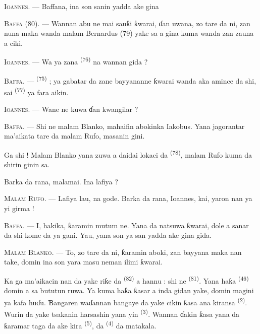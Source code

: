 \VUsaut{3.0mm}

\textsc{Ioannes}. --- Baffana, ina son sanin yadda ake gina

\textsc{Baffa} (80). --- Wannan abu ne mai sauƙi ƙwarai, ɗan uwana, zo
tare da ni, zan nuna maka wanda malam Bernardus (79) yake sa a gina
kuma wanda zan zauna a ciki.

\textsc{Ioannes}. --- Wa ya zana 
\textsuperscript{(76)} na wannan gida ?

\textsc{Baffa}. ---  \textsuperscript{(75)} ; ya
gabatar da zane bayyananne ƙwarai wanda aka amince da shi, sai
 \textsuperscript{(77)} ya fara aikin.

\textsc{Ioannes}. --- Wane ne kuwa ɗan kwangilar ?

\textsc{Baffa}. --- Shi ne malam Blanko, mahaifin abokinka Iakobus.
Yana jagorantar ma’aikata tare da malam Rufo, masanin gini.

Ga shi ! Malam Blanko yana zuwa a daidai lokaci da 
\textsuperscript{(78)}, malam Rufo kuma da shirin ginin sa.

Barka da rana, malamai. Ina lafiya ?

\textsc{Malam Rufo}. --- Lafiya lau, na gode. Barka da rana, Ioannes,
kai, yaron nan ya yi girma !

\textsc{Baffa}. --- I, hakika, ƙaramin mutum ne. Yana da natsuwa
ƙwarai, dole a sanar da shi kome da ya gani. Yau, yana son ya san
yadda ake gina gida.

\VUsaut{3.0mm}

\textsc{Malam Blanko}. --- To, zo tare da ni, ƙaramin aboki, zan
bayyana maka nan take, domin ina son yara masu neman ilimi ƙwarai.

Ka ga ma’aikacin nan da yake riƙe da 
\textsuperscript{(82)} a hannu : shi ne 
\textsuperscript{(81)}. Yana haƙa  \textsuperscript{(46)}
domin a sa bututun ruwa. Ya kuma haƙa ƙasar a inda gidan yake, domin
magini ya kafa  huɗu. Ɓangaren waɗannan bangaye da
yake cikin ƙasa ana kiransa  \textsuperscript{(2)}.
Wurin da yake tsakanin harsashin yana yin 
\textsuperscript{(3)}. Wannan ɗakin ƙasa yana da ƙaramar taga da ake
kira  \textsuperscript{(5)}, da 
\textsuperscript{(4)} da matakala.

